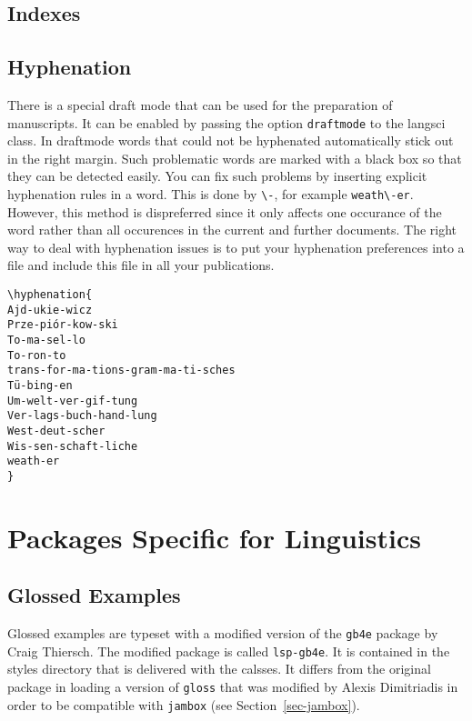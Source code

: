 \subsection{Indexes}


\subsection{Hyphenation}

There is a special draft mode that can be used for the preparation of manuscripts. It can be enabled
by passing the option \texttt{draftmode} to the langsci class. In draftmode words that could not be
hyphenated automatically stick out in the right margin. Such problematic words are marked with a
black box so that they can be detected easily. You can fix such problems by inserting explicit
hyphenation rules in a word. This is done by \verb+\-+, for example \verb+weath\-er+. However, this
method is dispreferred since it only affects one occurance of the word rather than all occurences in
the current and further documents. The right way to deal with hyphenation issues is to put your
hyphenation preferences into a file and include this file in all your publications. 

\begin{verbatim}
\hyphenation{
Ajd-ukie-wicz
Prze-piór-kow-ski
To-ma-sel-lo
To-ron-to
trans-for-ma-tions-gram-ma-ti-sches
Tü-bing-en
Um-welt-ver-gif-tung
Ver-lags-buch-hand-lung
West-deut-scher
Wis-sen-schaft-liche
weath-er
}
\end{verbatim}

%



\section{Packages Specific for Linguistics}

\subsection{Glossed Examples}

Glossed examples are typeset with a modified version of the \texttt{gb4e} package by Craig
Thiersch. The modified package is called \texttt{lsp-gb4e}. It is contained in the styles directory
that is delivered with the \lsp \latex calsses. It differs from the original package in loading a
version of \texttt{gloss} that was modified by Alexis Dimitriadis in order to be compatible with
\texttt{jambox} (see Section~\ref{sec-jambox}).

